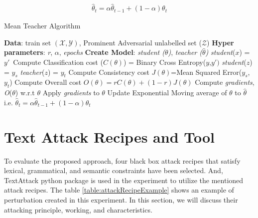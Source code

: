 \documentclass[%
	BCOR=8mm, %
	DIV=12,
	toc=bibliography, %
	toc=listof, %
	oneside, %
	egregdoesnotlikesansseriftitles, %
	]{scrbook}
\begin{document}
 \begin{equation}
     \begin{aligned}
         \hat\theta_t= \alpha\hat\theta_{t-1}+(1-\alpha)\theta_t
         \label{eq:ema}
         \end{aligned}
  \end{equation}

\begin{algorithm}[H]
    \caption{Mean Teacher Algorithm} \label{alg:MeanTeacher}
    \begin{algorithmic}
        \STATE \textbf{Data}: train set $\mathcal{(X,Y)}$,  Prominent Adversarial unlabelled set ($\mathcal{Z}$)
        \STATE \textbf{Hyper parameters}: \emph{r}, \emph{$\alpha$}, \emph{epochs}
        \STATE \textbf{Create Model}: \emph{student ($\theta$)}, \emph{teacher ($\hat\theta$)} 
        \STATE  \emph{student}($x$) = $y'$\
        \STATE Compute Classification cost ($C(\theta)$) = Binary Cross Entropy($y$,$y')$
        \STATE  \emph{student}($z$) = $y_s$
        \STATE  \emph{teacher}($z$) = $y_t$
        \STATE Compute Consistency cost $J(\theta)$=Mean Squared Error($y_s$,$y_{t}$)
        \STATE Compute Overall cost  $\textit{O}(\theta)= r C(\theta)+(1-r)J(\theta)$
        \STATE Compute \emph{gradients}, \textit{O}($\theta$) w.r.t  $\theta$ 
        \STATE Apply \emph{gradients} to $\theta$
        \STATE Update Exponential Moving average of $\theta$ to $\hat\theta$ i.e. $\hat\theta_t= \alpha\hat\theta_{t-1}+(1-\alpha)\theta_t$\
        \ENDWHILE
        \ENDFOR
    \end{algorithmic}
\end{algorithm}

\section{Text Attack Recipes and Tool}
\label{section:attackrecipes}
To evaluate the proposed approach, four black box attack recipes that satisfy lexical, grammatical, and semantic constraints have been selected. And,  TextAttack python package \cite{morris_textattack_2020} is used in the experiment to utilize the mentioned attack recipes. The table \ref{table:attackRecipeExample} shows an example of perturbation created in this experiment. In this section, we will discuss their attacking principle, working, and characteristics.
\end{document}
